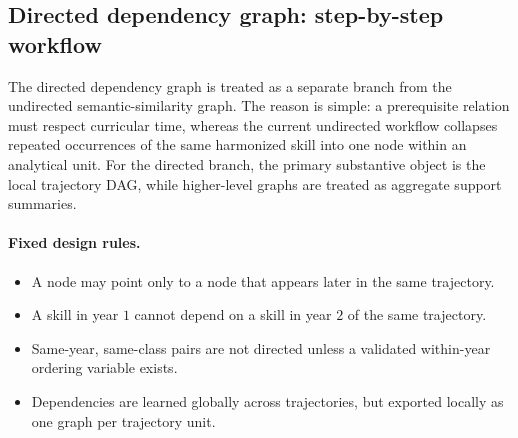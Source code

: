 \subsection{Directed dependency graph: step-by-step workflow}
\label{sec:directed_dependency_stepwise}

The directed dependency graph is treated as a separate branch from the undirected
semantic-similarity graph. The reason is simple: a prerequisite relation must respect
curricular time, whereas the current undirected workflow collapses repeated occurrences of the
same harmonized skill into one node within an analytical unit. For the directed branch, the
primary substantive object is the local trajectory DAG, while higher-level graphs are treated as
aggregate support summaries.

\paragraph{Fixed design rules.}
\begin{itemize}
    \item A node may point only to a node that appears later in the same trajectory.
    \item A skill in year $1$ cannot depend on a skill in year $2$ of the same trajectory.
    \item Same-year, same-class pairs are not directed unless a validated within-year ordering
    variable exists.
    \item Dependencies are learned globally across trajectories, but exported locally as one graph
    per trajectory unit.
\end{itemize}

